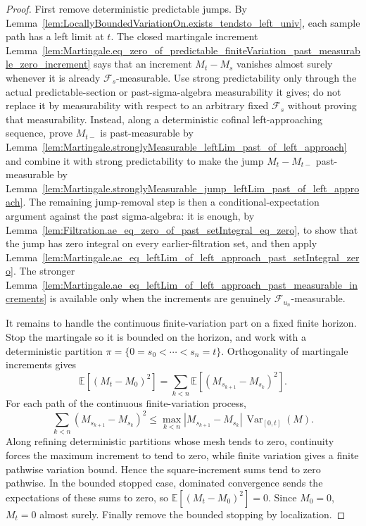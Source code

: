 \begin{proof}
First remove deterministic predictable jumps.  By
Lemma~\ref{lem:LocallyBoundedVariationOn.exists_tendsto_left_univ}, each
sample path has a left limit at \(t\).  The closed martingale increment
Lemma~\ref{lem:Martingale.eq_zero_of_predictable_finiteVariation_past_measurable_zero_increment}
says that an increment \(M_t-M_s\) vanishes almost surely whenever it is
already \(\mathcal F_s\)-measurable.  Use strong predictability only through
the actual predictable-section or past-sigma-algebra measurability it gives;
do not replace it by measurability with respect to an arbitrary fixed
\(\mathcal F_s\) without proving that measurability.  Instead, along a
deterministic cofinal left-approaching sequence, prove
\(M_{t-}\) is past-measurable by
Lemma~\ref{lem:Martingale.stronglyMeasurable_leftLim_past_of_left_approach}
and combine it with strong predictability to make the jump
\(M_t-M_{t-}\) past-measurable by
Lemma~\ref{lem:Martingale.stronglyMeasurable_jump_leftLim_past_of_left_approach}.
The remaining jump-removal step is then a conditional-expectation argument
against the past sigma-algebra: it is enough, by
Lemma~\ref{lem:Filtration.ae_eq_zero_of_past_setIntegral_eq_zero}, to show
that the jump has zero integral on every earlier-filtration set, and then
apply
Lemma~\ref{lem:Martingale.ae_eq_leftLim_of_left_approach_past_setIntegral_zero}.
The stronger
Lemma~\ref{lem:Martingale.ae_eq_leftLim_of_left_approach_past_measurable_increments}
is available only when the increments are genuinely
\(\mathcal F_{u_n}\)-measurable.

It remains to handle the continuous finite-variation part on a fixed finite
horizon.  Stop the martingale so it is bounded on the horizon, and work with
a deterministic partition
\(\pi=\{0=s_0<\cdots<s_n=t\}\).  Orthogonality of martingale increments gives
\[
  \mathbb E[(M_t-M_0)^2]
  =
  \sum_{k<n}\mathbb E[(M_{s_{k+1}}-M_{s_k})^2].
\]
For each path of the continuous finite-variation process,
\[
  \sum_{k<n} (M_{s_{k+1}}-M_{s_k})^2
  \le
  \max_{k<n}|M_{s_{k+1}}-M_{s_k}|\,
  \operatorname{Var}_{[0,t]}(M).
\]
Along refining deterministic partitions whose mesh tends to zero, continuity
forces the maximum increment to tend to zero, while finite variation gives a
finite pathwise variation bound.  Hence the square-increment sums tend to
zero pathwise.  In the bounded stopped case, dominated convergence sends the
expectations of these sums to zero, so
\(\mathbb E[(M_t-M_0)^2]=0\).  Since \(M_0=0\), \(M_t=0\) almost surely.
Finally remove the bounded stopping by localization.
\end{proof}


